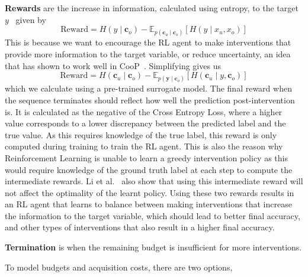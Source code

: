 \textbf{Rewards} are the increase in 
    information, calculated using entropy, to the target $y$~\cite{afa} given by
    \begin{equation}\label{equation:information-gain-hard}
    \text{Reward} = H(y \mid \mathbf{c}_o) - \mathbb{E}_{p(\mathbf{c}_u \mid \mathbf{c}_o)} [H(y \mid x_u, x_o)]
    \end{equation}
    This is because we want to encourage the RL agent to make interventions
    that provide more information to the target variable, or reduce uncertainty, an idea that has shown
    to work well in CooP~\cite{coop}.
    Simplifying gives us
    \begin{equation}\label{equation:information-gain}
    \text{Reward} = H(\mathbf{c}_u \mid \mathbf{c}_o) - 
    \mathbb{E}_{p(\mathbf{y} \mid \mathbf{c}_o)} [H(\mathbf{c}_u \mid y, \mathbf{c}_o)]
    \end{equation}
    which we calculate using a pre-trained surrogate model.
    The final reward when the sequence terminates 
    should reflect how well the prediction post-intervention is.
    It is calculated as the negative of the Cross Entropy Loss, where a higher value corresponds to 
    a lower discrepancy between the predicted label and the true value. 
    As this requires knowledge of the true label,
    this reward is only computed during training to train the RL agent. 
    This is also the reason why
    Reinforcement Learning is unable to learn a greedy intervention policy as this would
    require knowledge of the ground truth label at each step to compute the intermediate rewards.
    Li et al.~\cite{afa} 
    also show that using this intermediate reward will not affect the optimality of the learnt policy.
    Using these two rewards
     results in an RL agent that learns to balance between making interventions that
    increase the information to the target variable, which should lead to better final accuracy,
    and other types of interventions that also result in a higher final accuracy.

    
\textbf{Termination} is when the remaining budget is insufficient for more interventions.
    

To model budgets and acquisition costs, there are two options,

